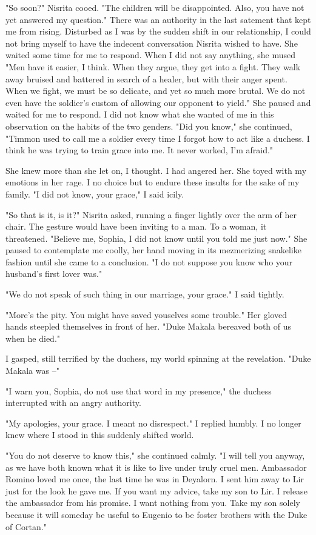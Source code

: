 \documentclass{article}
\begin{document}
"So soon?" Nisrita cooed. "The children will be disappointed. Also, you have not yet answered my question." There was an authority in the last satement that kept  me from rising. Disturbed as I was by the sudden shift in our relationship, I could not bring myself to have the indecent conversation Nisrita wished to have. She waited some time for me to respond. When I did not say anything, she mused "Men have it easier, I think. When they argue, they get into a fight. They walk away bruised and battered in search of a healer, but with their anger spent. When we fight, we must be so delicate, and yet so much more brutal. We do not even have the soldier's custom of allowing our opponent to yield." She paused and waited for me to respond. I did not know what she wanted of me in this observation on the habits of the two genders. "Did you know," she continued, "Timmon used to call me a soldier every time I forgot how to act like a duchess. I think he was trying to train grace into me. It never worked, I'm afraid."

She knew more than she let on, I thought. I had angered her. She toyed with my emotions in her rage. I no choice but to endure these insults for the sake of my family. "I did not know, your grace," I said icily.

"So that is it, is it?" Nisrita asked, running a finger lightly over the arm of her chair. The gesture would have been inviting to a man. To a woman, it threatened. "Believe me, Sophia, I did not know until you told me just now." She paused to contemplate me coolly, her hand moving in its mezmerizing snakelike fashion until she came to a conclusion. "I do not suppose you know who your husband's first lover was."

"We do not speak of such thing in our marriage, your grace." I said tightly. 

"More's the pity. You might have saved youselves some trouble." Her gloved hands steepled themselves in front of her. "Duke Makala bereaved both of us when he died."

I gasped, still terrified by the duchess, my world spinning at the revelation. "Duke Makala was --"

"I warn you, Sophia, do not use that word in my presence," the duchess interrupted with an angry authority.

"My apologies, your grace. I meant no disrespect." I replied humbly. I no longer knew where I stood in this suddenly shifted world. 

"You do not deserve to know this," she continued calmly. "I will tell you anyway, as we have both known what it is like to live under truly cruel men. Ambassador Romino loved me once, the last time he was in Deyalorn. I sent him away to Lir just for the look he gave me. If you want my advice, take my son to Lir. I release the ambassador from his promise. I want nothing from you. Take my son solely because it will someday be useful to Eugenio to be foster brothers with the Duke of Cortan."
\end{document}
